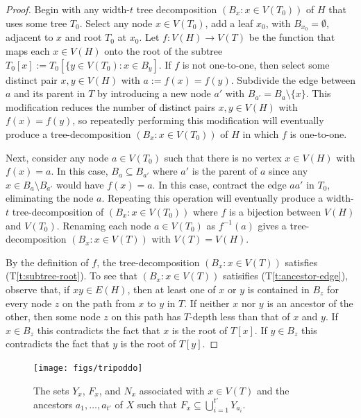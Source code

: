 \documentclass{patmorin}
\newcommand{\tref}[1]{(T\ref{t:#1})}
\begin{document}
\begin{proof}
  Begin with any width-$t$ tree decomposition $(B_x:x\in V(T_0))$ of $H$ that uses some tree $T_0$.  Select any node $x\in V(T_0)$, add a leaf $x_0$, with $B_{x_0}=\emptyset$, adjacent to $x$ and root $T_0$ at $x_0$.  Let $f:V(H)\to V(T)$ be the function that maps each $x\in V(H)$ onto the root of the subtree $T_0[x]:=T_0[\{y\in V(T_0): x\in B_y]$.  If $f$ is not one-to-one, then select some distinct pair $x,y\in V(H)$ with $a:=f(x)=f(y)$.  Subdivide the edge between $a$ and its parent in $T$ by introducing a new node $a'$ with $B_{a'}=B_{a}\setminus\{x\}$.  This modification reduces the number of distinct pairs $x,y\in V(H)$ with $f(x)=f(y)$, so repeatedly performing this modification will eventually produce a tree-decomposition $(B_x:x\in V(T_0))$ of $H$ in which $f$ is one-to-one.
  
  Next, consider any node $a\in V(T_0)$ such that there is no vertex $x\in V(H)$ with $f(x)=a$.  In this case, $B_{a}\subseteq B_{a'}$ where $a'$ is the parent of $a$ since any $x\in B_a\setminus B_{a'}$ would have $f(x)=a$.  In this case, contract the edge $aa'$ in $T_0$, eliminating the node $a$.  Repeating this operation will eventually produce a width-$t$ tree-decomposition of $(B_x:x\in V(T_0))$ where $f$ is a bijection between $V(H)$ and $V(T_0)$.  Renaming each node $a\in V(T_0)$ as $f^{-1}(a)$ gives a tree-decomposition $(B_x:x\in V(T))$ with $V(T)=V(H)$.  
  
  By the definition of $f$, the tree-decomposition $(B_x:x\in V(T))$ satisfies \tref{subtree-root}.  To see that $(B_x:x\in V(T))$ satisifies \tref{ancestor-edge}, observe that, if $xy\in E(H)$, then at least one of $x$ or $y$ is contained in $B_z$ for every node $z$ on the path from $x$ to $y$ in $T$.  If neither $x$ nor $y$ is an ancestor of the other, then some node $z$ on this path has $T$-depth less than that of $x$ and $y$.  If $x\in B_z$ this contradicts the fact that $x$ is the root of $T[x]$.  If $y\in B_z$ this contradicts the fact that $y$ is the root of $T[y]$.
\end{proof}



\begin{figure}[htbp]
  \begin{center}
    \texttt{[image: figs/tripoddo]}
  \end{center}
  \caption{The sets $Y_x$, $F_x$, and $N_x$ associated with $x\in V(T)$
  and the ancestors $a_1,\ldots,a_{t'}$ of $X$ such that $F_x \subseteq \bigcup_{i=1}^{t'} Y_{a_i}$.}
  \label{fig:generalized-tripod}
\end{figure}
\end{document}
